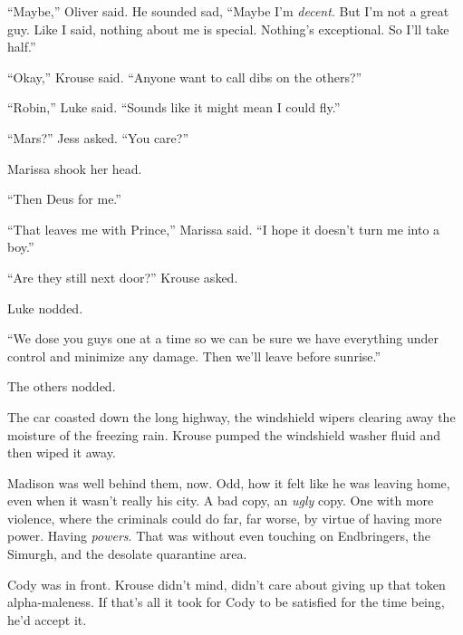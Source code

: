 ``Maybe,'' Oliver said.  He sounded sad, ``Maybe I'm \emph{decent}.  But I'm not a great guy.  Like I said, nothing about me is special.  Nothing's exceptional.  So I'll take half.''



``Okay,'' Krouse said.  ``Anyone want to call dibs on the others?''



``Robin,'' Luke said.  ``Sounds like it might mean I could fly.''



``Mars?'' Jess asked.  ``You care?''



Marissa shook her head.



``Then Deus for me.''



``That leaves me with Prince,'' Marissa said.  ``I hope it doesn't turn me into a boy.''



``Are they still next door?'' Krouse asked.



Luke nodded.



``We dose you guys one at a time so we can be sure we have everything under control and minimize any damage.  Then we'll leave before sunrise.''



The others nodded.



\sectionbreak



The car coasted down the long highway, the windshield wipers clearing away the moisture of the freezing rain.  Krouse pumped the windshield washer fluid and then wiped it away.



Madison was well behind them, now.  Odd, how it felt like he was leaving home, even when it wasn't really his city.  A bad copy, an \emph{ugly }copy.  One with more violence, where the criminals could do far, far worse, by virtue of having more power.  Having \emph{powers}.  That was without even touching on Endbringers, the Simurgh, and the desolate quarantine area.



Cody was in front.  Krouse didn't mind, didn't care about giving up that token alpha-maleness.  If that's all it took for Cody to be satisfied for the time being, he'd accept it.



